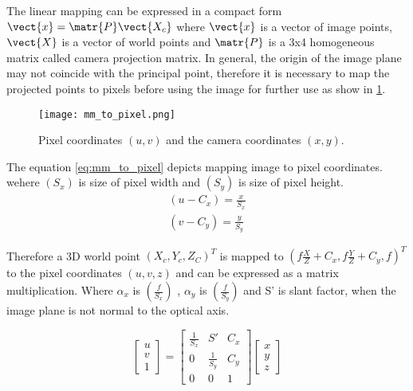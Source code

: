 The linear mapping can be expressed in a compact form $ \vect{x} = \matr{P} \vect{X_c} $ where $\vect{x}$ is a vector of image points, $\vect{X}$ is a vector of world points and $\matr{P}$ is a 3x4 homogeneous matrix called camera projection matrix. In general, the origin of the image plane may not coincide with the principal point, therefore it is necessary to map the projected points to pixels before using the image for further use as show in \cref{fig:mm_to_pixel}.

\begin{figure}[hbt!]
	\centering
	\texttt{[image: mm\_to\_pixel.png]}
	\caption{Pixel coordinates $(u,v)$ and the camera coordinates $(x, y)$.}
	\label{fig:mm_to_pixel}
\end{figure}

The equation \ref{eq:mm_to_pixel} depicts mapping image to pixel coordinates. wehere $(S_x)$ is size of pixel width and  $(S_y)$ is size of pixel height. \\
\begin{equation}
\begin{split}
(u-C_x) = \frac{x}{S_x}\\
(v-C_y) = \frac{y}{S_y}
\label{eq:mm_to_pixel}
\end{split}
\end{equation}

Therefore a 3D world point \((X_c, Y_c, Z_C)^T\) is mapped to \( ( \textit{f}\frac{X}{Z}+C_x, \textit{f}\frac{Y}{Z}+C_y, \textit{f} )^T \) to the pixel coordinates \( (u, v, z) \) and can be expressed as a matrix multiplication. Where $\alpha_x$ is $(\frac{\textit{f}}{S_x})$ , $\alpha_y$ is $(\frac{\textit{f}}{S_y})$ and S' is slant factor, when the image plane is not normal to the optical axis.

\begin{equation}
\left[ 
\begin{array}{c} u\\ v\\ 1 \end{array} 
\right] = 
\begin{bmatrix}
\frac{1}{S_x} & S' & C_x \\
0 & \frac{1}{S_y} & C_y \\
0 & 0 & 1
\end{bmatrix} 
\left[ 
\begin{array}{c} x\\ y\\ z \end{array} 
\right]
\label{eq:mat_pixel_t_image}
\end{equation}

